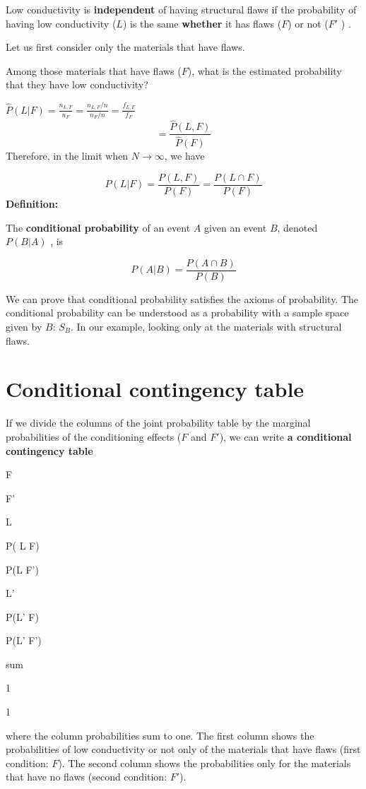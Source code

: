 \documentclass[
]{book}
\begin{document}
Low conductivity is \textbf{independent} of having structural flaws if the probability of having low conductivity (\(L\)) is the same \textbf{whether} it has flaws (\(F\)) or not (\(F'\) ) .

Let us first consider only the materials that have flaws.

Among those materials that have flaws (\(F\)), what is the estimated probability that they have low conductivity?

\(\hat{P}(L| F)= \frac{n_{L,F}}{n_{F}}=\frac{n_{L,F}/n}{n_{F}/n}= \frac{f_{L,F}}{f_{F}}\)
\[= \frac{\hat{P}( L,F )}{\hat{P}(F)}\]
Therefore, in the limit when \(N \rightarrow \infty\), we have

\[P(L| F)= \frac{P(L,F)}{P(F)}=\frac{P(L\cap F)}{P(F)}\]
\textbf{Definition:}

The \textbf{conditional probability} of an event \(A\) given an event \(B\), denoted \(P(B| A)\) , is

\[P(A|B) = \frac{P(A\cap B)}{P(B)}\]

We can prove that conditional probability satisfies the axioms of probability. The conditional probability can be understood as a probability with a sample space given by \(B\): \(S_B\). In our example, looking only at the materials with structural flaws.

\hypertarget{conditional-contingency-table}{%
\section{Conditional contingency table}\label{conditional-contingency-table}}

If we divide the columns of the joint probability table by the marginal probabilities of the conditioning effects (\(F\) and \(F'\)), we can write \textbf{a conditional contingency table}

F

F'

L

P( L {\textbar{}} F)

P(L {\textbar{}} F')

L'

P(L' {\textbar{}} F)

P(L' {\textbar{}} F')

sum

1

1

where the column probabilities sum to one. The first column shows the probabilities of low conductivity or not only of the materials that have flaws (first condition: \(F\)). The second column shows the probabilities only for the materials that have no flaws (second condition: \(F'\)).
\end{document}
